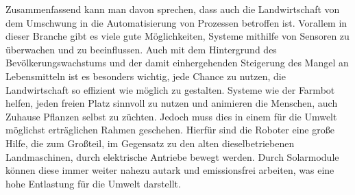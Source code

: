 Zusammenfassend kann man davon sprechen, dass auch die Landwirtschaft von dem
Umschwung in die Automatisierung von Prozessen betroffen ist. Vorallem in
dieser Branche gibt es viele gute Möglichkeiten, Systeme mithilfe von Sensoren
zu überwachen und zu beeinflussen. Auch mit dem Hintergrund des
Bevölkerungswachstums und der damit einhergehenden Steigerung des Mangel an
Lebensmitteln ist es besonders wichtig, jede Chance zu nutzen, die
Landwirtschaft so effizient wie möglich zu gestalten. Systeme wie der Farmbot
helfen, jeden freien Platz sinnvoll zu nutzen und animieren die Menschen, auch
Zuhause Pflanzen selbst zu züchten. Jedoch muss dies in einem für die Umwelt
möglichst erträglichen Rahmen geschehen. Hierfür sind die Roboter eine große
Hilfe, die zum Großteil, im Gegensatz zu den alten dieselbetriebenen
Landmaschinen, durch elektrische Antriebe bewegt werden. Durch Solarmodule
können diese immer weiter nahezu autark und emissionsfrei arbeiten, was eine
hohe Entlastung für die Umwelt darstellt.